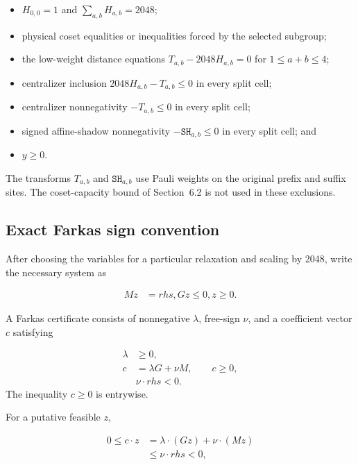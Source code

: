 \documentclass[11pt]{article}
\providecommand{\tightlist}{\setlength{\itemsep}{0pt}\setlength{\parskip}{0pt}}
\begin{document}
\begin{itemize}
\tightlist
\item
  \(H_{0,0}=1\) and \(\sum_{a,b}H_{a,b}=2048\);
\item
  physical coset equalities or inequalities forced by the selected subgroup;
\item
  the low-weight distance equations \(T_{a,b}-2048H_{a,b}=0\) for \(1 \le a+b \le 4\);
\item
  centralizer inclusion \(2048H_{a,b}-T_{a,b} \le 0\) in every split cell;
\item
  centralizer nonnegativity \(-T_{a,b} \le 0\) in every split cell;
\item
  signed affine-shadow nonnegativity \(-\mathtt{SH}_{a,b} \le 0\) in every split cell; and
\item
  \(y \ge 0\).
\end{itemize}

The transforms \(T_{a,b}\) and \(\mathtt{SH}_{a,b}\) use Pauli weights on the original prefix and suffix sites. The coset-capacity bound of Section~6.2 is not used in these exclusions.

\subsection{Exact Farkas sign convention}\label{exact-farkas-sign-convention}

After choosing the variables for a particular relaxation and scaling by 2048, write the necessary system as

\[
\begin{aligned}
M z &=rhs,     G z  \le  0,     z  \ge  0.
\end{aligned}
\]

A Farkas certificate consists of nonnegative \(\lambda\), free-sign \(\nu\), and a coefficient vector \(c\) satisfying

\[
\begin{aligned}
\lambda  &\ge  0, \\
c &=\lambda G + \nu M, \qquad c\geq 0, \\
& \nu \cdot rhs < 0.
\end{aligned}
\]
The inequality \(c\geq0\) is entrywise.

For a putative feasible \(z\),

\[
\begin{aligned}
0  \le  c \cdot z &=\lambda \cdot (G z) + \nu \cdot (M z) \\
 &\le  \nu \cdot rhs < 0,
\end{aligned}
\]
\end{document}

